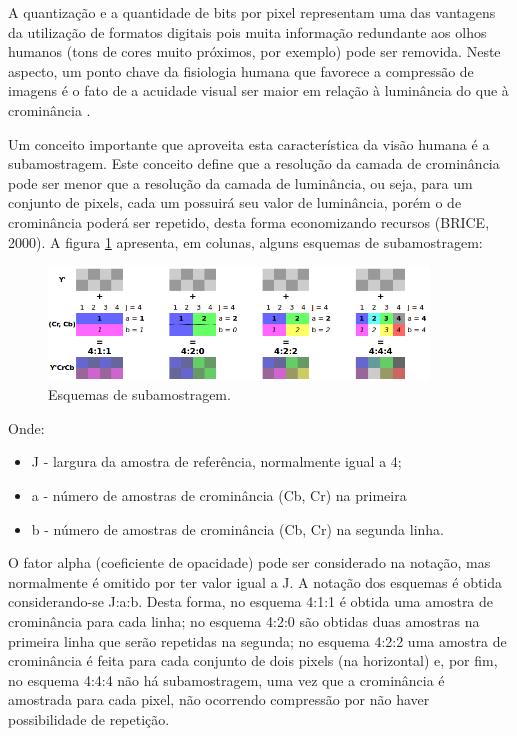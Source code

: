 A quantização e a quantidade de bits por pixel representam uma das vantagens da utilização de formatos digitais pois muita informação redundante aos olhos humanos (tons de cores muito próximos, por exemplo) pode ser removida. Neste aspecto, um ponto chave da fisiologia humana que favorece a compressão de imagens é o fato de a acuidade visual ser maior em relação à luminância do que à crominância \cite{vandenbranden}.

Um conceito importante que aproveita esta característica da visão humana é a subamostragem. Este conceito define que a resolução da camada de crominância pode ser menor que a resolução da camada de luminância, ou seja, para um conjunto de pixels, cada um possuirá seu valor de luminância, porém o de crominância poderá ser repetido, desta forma economizando recursos (BRICE, 2000). A figura \ref{fig:subsampling} apresenta, em colunas, alguns esquemas de subamostragem:

\begin{figure}[!htb]
	\centering
	\includegraphics[width=0.9\textwidth]{./imgs/subsamplingschemes.png}
	\caption{Esquemas de subamostragem.}
	\label{fig:subsampling}
\end{figure}

Onde:
\begin{itemize}
	\item J - largura da amostra de referência, normalmente igual a 4;
	\item a - número de amostras de crominância (Cb, Cr) na primeira 
	\item b - número de amostras de crominância (Cb, Cr) na segunda linha.
\end{itemize}

O fator alpha (coeficiente de opacidade) pode ser considerado na notação, mas normalmente é omitido por ter valor igual a J. A notação dos esquemas é obtida considerando-se J:a:b. Desta forma, no esquema 4:1:1 é obtida uma amostra de crominância para cada linha; no esquema 4:2:0 são obtidas duas amostras na primeira linha que serão repetidas na segunda; no esquema 4:2:2 uma amostra de crominância é feita para cada conjunto de dois pixels (na horizontal) e, por fim, no esquema 4:4:4 não há subamostragem, uma vez que a crominância é amostrada para cada pixel, não ocorrendo compressão por não haver possibilidade de repetição.

